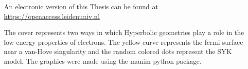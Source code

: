 \begin{titlepage}
\vspace{2\bigskipamount}


\vspace{5pt}
\noindent
An electronic version of this Thesis can be found at \\ 
\href{https://openaccess.leidenuniv.nl}{https://openaccess.leidenuniv.nl}



\vspace*{\fill}
\noindent
The cover represents two ways in which Hyperbolic geometries play a role in the low energy properties of electrons. The yellow curve represents the fermi surface near a van-Hove singularity and the random colored dots represent the SYK model. The graphics were made using the manim python package.

\clearpage
\thispagestyle{empty}


\end{titlepage}
